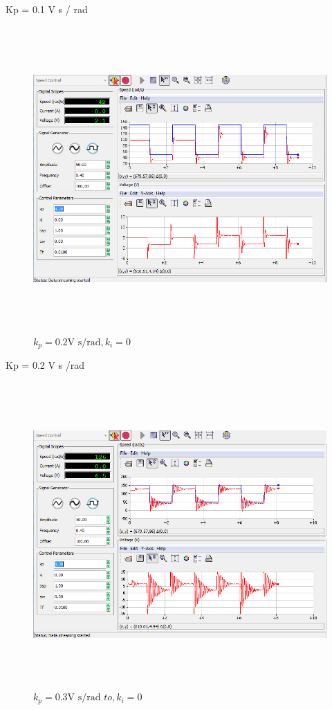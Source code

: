\documentclass[]{article}
\begin{document}
Kp = 0.1 V s / rad

\begin{figure}\includegraphics[width=6.50000in,height=4.59722in]{media/image56.png} \caption{$k_p = 0.2 \text{V s/rad}, k_i = 0$} \end{figure}

Kp = 0.2 V s /rad

\begin{figure}\includegraphics[width=6.50000in,height=4.59722in]{media/image60.png} \caption{$k_p = 0.3 \text{V s/rad } to, k_i = 0$} \end{figure}
\end{document}
